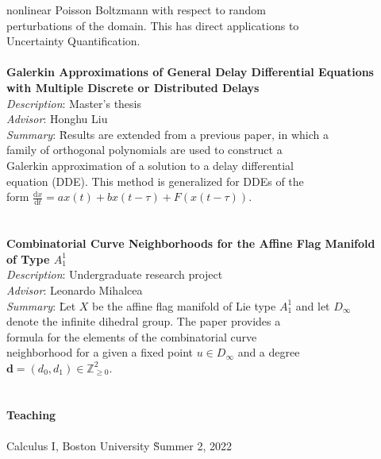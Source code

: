 \begin{center}
\begin{tabbing}
	\> \> \> nonlinear Poisson Boltzmann with respect to random \\
	\> \> \> perturbations of the domain. This has direct applications to \\
	\> \> \> Uncertainty Quantification. \\
	\> \\
	\> \textbf{{Galerkin Approximations of General Delay Differential Equations}} \\
	\> \textbf{{with Multiple Discrete or Distributed Delays}} \\
	\> \> \emph{Description}: Master's thesis \\
	\> \> \emph{Advisor}: Honghu Liu \\
	\> \> \emph{Summary}: \= Results are extended from a previous paper, in which a \\
	\> \> \> family of orthogonal polynomials are used to construct a  \\
	\> \> \> Galerkin approximation of a solution to a delay differential   \\
	\> \> \> equation (DDE). This method is generalized for DDEs of the  \\
	\> \> \> form \(\frac{\mathrm d x}{\mathrm d t} = ax(t) + bx(t-\tau) + F(x(t-\tau)).\) \\
	\\
	\> \\
	\> \textbf{{Combinatorial Curve Neighborhoods for the Affine Flag Manifold }}  \\
	\> \textbf{{of Type $A^1_1$}} \\
	\> \> \emph{Description}: Undergraduate research project\\
	\> \> \emph{Advisor}: Leonardo Mihalcea\\
	\> \> \emph{Summary}: \= Let \(X\) be the affine flag manifold of Lie type \(A^1_1\) and let \(D_\infty\)  \\ 
	\> \> \> denote the infinite dihedral group. The paper provides a  \\
	\> \> \> formula for the elements of the combinatorial curve  \\
	\> \> \> neighborhood for a given a fixed point \(u\in D_\infty\) and a degree \\
	\> \> \> \(\mathbf d = (d_0,d_1)\in \mathbb Z^2_{\geq 0}\).
	\\
	\\ \\
	\textbf{{Teaching}} \\
	\\
	\> Calculus I, Boston University  \` Summer 2, 2022 \\

\end{tabbing}
\end{center}

